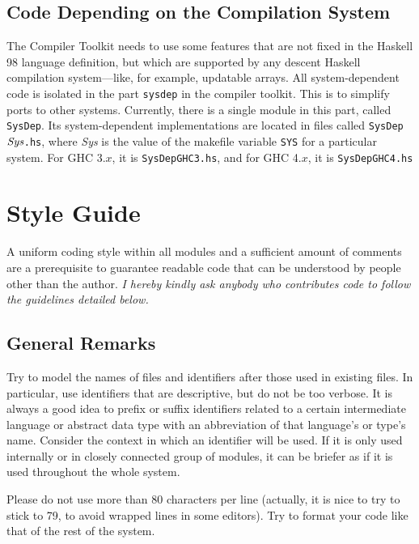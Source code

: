 \documentclass{report}
\newcommand{\code}[1]{\texttt{#1}}
\begin{document}
\section{Code Depending on the Compilation System}

The Compiler Toolkit needs to use some features that are not fixed in the
Haskell 98 language definition, but which are supported by any descent Haskell
compilation system---like, for example, updatable arrays.  All
system-dependent code is isolated in the part \code{sysdep} in the compiler
toolkit.  This is to simplify ports to other systems.  Currently, there is a
single module in this part, called \code{SysDep}.  Its system-dependent
implementations are located in files called \code{SysDep$\textit{\rmfamily
    Sys}$.hs}, where \textit{Sys} is the value of the makefile variable
\code{SYS} for a particular system.  For GHC 3.$x$, it is \code{SysDepGHC3.hs},
and for GHC 4.$x$, it is \code{SysDepGHC4.hs}


\chapter{Style Guide}

A uniform coding style within all modules and a sufficient amount of comments
are a prerequisite to guarantee readable code that can be understood by people
other than the author.  \emph{I hereby kindly ask anybody who contributes code
  to follow the guidelines detailed below.}


\section{General Remarks}

Try to model the names of files and identifiers after those used in existing
files.  In particular, use identifiers that are descriptive, but do not be too
verbose.  It is always a good idea to prefix or suffix identifiers related to
a certain intermediate language or abstract data type with an abbreviation of
that language's or type's name.  Consider the context in which an identifier
will be used.  If it is only used internally or in closely connected group of
modules, it can be briefer as if it is used throughout the whole system.

Please do not use more than 80 characters per line (actually, it is nice to try
to stick to 79, to avoid wrapped lines in some editors).  Try to format your
code like that of the rest of the system.
\end{document}

